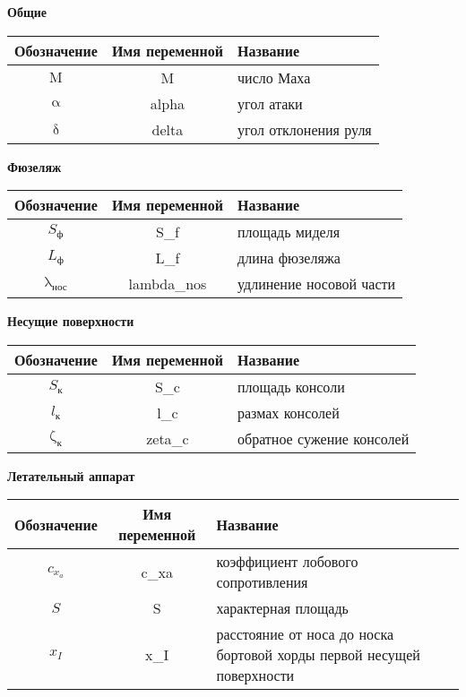 \documentclass[a4paper, 12pt]{report}
\renewcommand{\alpha}{\upalpha}
\renewcommand{\delta}{\updelta}
\renewcommand{\lambda}{\uplambda}
\renewcommand{\zeta}{\upzeta}
\newcommand{\Mach}{\mathrm{M}}
\begin{document}
	\begin{center}
		\textbf{Общие}
		\begin{tabular}{c c p{8cm}}
			Обозначение & Имя переменной & Название \\ \hline
			$ \Mach  $  & M              & число Маха \\ \hline
			$ \alpha $  & alpha          & угол атаки \\ \hline
			$ \delta $  & delta          & угол отклонения руля \\ \hline		
		\end{tabular}
		\bigbreak
		
		\textbf{Фюзеляж}
		\begin{tabular}{c c p{8cm}}
			Обозначение             & Имя переменной  & Название \\ \hline
			$ S_\text{ф}    $       & S\_f            & площадь миделя \\ \hline
			$ L_\text{ф}    $       & L\_f            & длина фюзеляжа \\ \hline
			$ \lambda_\text{нос} $  & lambda\_nos     & удлинение носовой части \\ \hline		
		\end{tabular}
		\bigbreak
		
		\textbf{Несущие поверхности}
		\begin{tabular}{c c p{8cm}}
			Обозначение             & Имя переменной  & Название \\ \hline
			$ S_\text{к}   $        & S\_c            & площадь консоли \\ \hline
			$ l_\text{к}    $       & l\_c            & размах консолей \\ \hline
			$ \zeta_\text{к} $      & zeta\_c         & обратное сужение консолей \\ \hline		
		\end{tabular}
		\bigbreak
		
		\textbf{Летательный аппарат}
		\begin{tabular}{c c p{8cm}}
			Обозначение             & Имя переменной  & Название \\ \hline
			$ c_{x_a}   $           & c\_xa           & коэффициент лобового сопротивления \\ \hline
			$ S       $             & S               & характерная площадь \\ \hline
			$ x_I $                 & x\_I            & расстояние от носа до носка бортовой хорды первой несущей поверхности \\ \hline		
		\end{tabular}
	\end{center}
\end{document}
